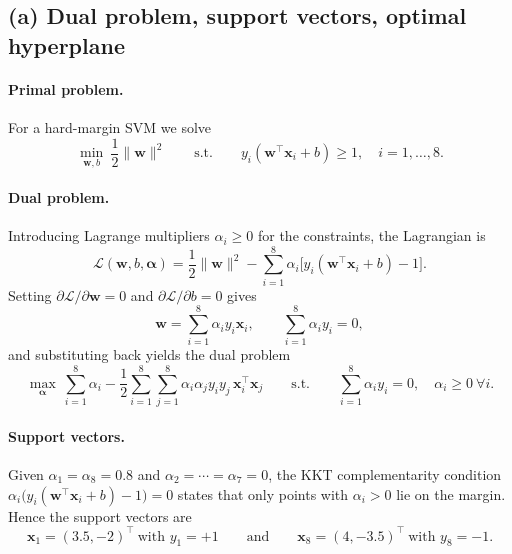 \documentclass[11pt]{article}
\newcommand{\bx}{\mathbf{x}}
\newcommand{\bw}{\mathbf{w}}
\begin{document}
\subsection*{(a) Dual problem, support vectors, optimal hyperplane}

\paragraph{Primal problem.} For a hard-margin SVM we solve
\[
\min_{\bw,b}\ \frac12\|\bw\|^2
\qquad\text{s.t.}\qquad
y_i(\bw^{\top}\bx_i+b)\ge 1,\quad i=1,\dots,8 .
\]

\paragraph{Dual problem.} Introducing Lagrange multipliers
$\alpha_i\ge 0$ for the constraints, the Lagrangian is
\[
\mathcal{L}(\bw,b,\boldsymbol{\alpha})
= \frac12\|\bw\|^2 - \sum_{i=1}^{8}\alpha_i\bigl[y_i(\bw^{\top}\bx_i+b)-1\bigr].
\]
Setting $\partial\mathcal{L}/\partial\bw=0$ and $\partial\mathcal{L}/\partial b=0$ gives
\[
\bw=\sum_{i=1}^{8}\alpha_i y_i \bx_i,
\qquad
\sum_{i=1}^{8}\alpha_i y_i = 0 ,
\]
and substituting back yields the dual problem
\[
\boxed{
\max_{\boldsymbol{\alpha}}\ \sum_{i=1}^{8}\alpha_i
-\frac12\sum_{i=1}^{8}\sum_{j=1}^{8}\alpha_i\alpha_j y_i y_j\,\bx_i^{\top}\bx_j
\qquad\text{s.t.}\qquad
\sum_{i=1}^{8}\alpha_i y_i=0,\quad \alpha_i\ge 0\ \forall i.
}
\]

\paragraph{Support vectors.} Given
$\alpha_1=\alpha_8=0.8$ and $\alpha_2=\cdots=\alpha_7=0$, the KKT
complementarity condition $\alpha_i\bigl(y_i(\bw^{\top}\bx_i+b)-1\bigr)=0$ states that only
points with $\alpha_i>0$ lie on the margin. Hence the support vectors are
\[
\boxed{\ \bx_1=(3.5,-2)^{\top}\ \text{with } y_1=+1
\qquad\text{and}\qquad
\bx_8=(4,-3.5)^{\top}\ \text{with } y_8=-1 .\ }
\]
\end{document}
